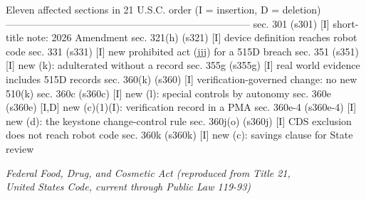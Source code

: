 \begin{asciifig}
Eleven affected sections in 21 U.S.C. order   (I = insertion, D = deletion)
--------------------------------------------------------------------------
  sec. 301     (s301)     [I]   short-title note: 2026 Amendment
  sec. 321(h)  (s321)     [I]   device definition reaches robot code
  sec. 331     (s331)     [I]   new prohibited act (jjj) for a 515D breach
  sec. 351     (s351)     [I]   new (k): adulterated without a record
  sec. 355g    (s355g)    [I]   real world evidence includes 515D records
  sec. 360(k)  (s360)     [I]   verification-governed change: no new 510(k)
  sec. 360c    (s360c)    [I]   new (l): special controls by autonomy
  sec. 360e    (s360e)    [I,D] new (c)(1)(I): verification record in a PMA
  sec. 360e-4  (s360e-4)  [I]   new (d): the keystone change-control rule
  sec. 360j(o) (s360j)    [I]   CDS exclusion does not reach robot code
  sec. 360k    (s360k)    [I]   new (c): savings clause for State review
\end{asciifig}

\begin{center}\small\itshape Federal Food, Drug, and Cosmetic Act (reproduced from
Title 21,\\United States Code, current through Public Law 119-93)\end{center}



\begin{center}\small *\quad *\quad *\quad *\quad *\quad *\quad *\end{center}





